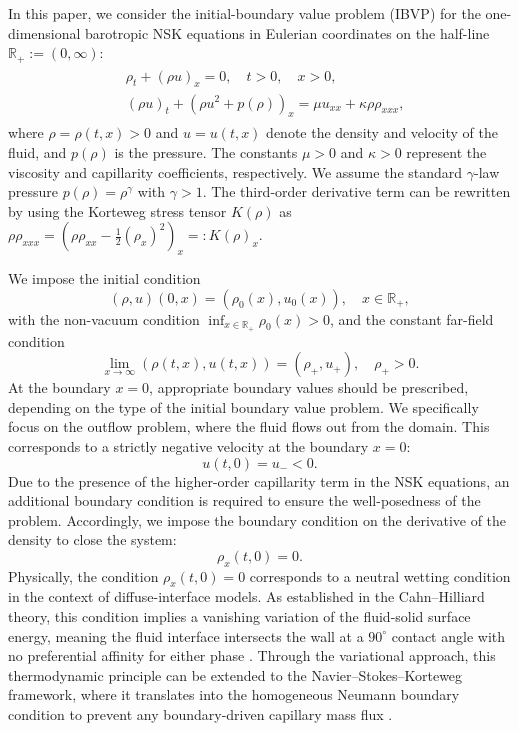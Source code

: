 \documentclass[11pt,reqno]{amsart}
\numberwithin{equation}{section} %
\begin{document}
In this paper, we consider the initial-boundary value problem (IBVP) for the one-dimensional barotropic NSK equations in Eulerian coordinates on the half-line $\mathbb{R}_+ := (0, \infty)$:
\begin{align} \label{eq:NSK}
\begin{aligned}
    &\rho_t +(\rho u)_x=0, \quad t>0, \quad x>0, \\
    &(\rho u)_t +(\rho u^2+p(\rho))_x = \mu u_{xx} + \kappa \rho\rho_{xxx},
\end{aligned}
\end{align}
where $\rho=\rho(t,x)>0$ and $u=u(t,x)$ denote the density and velocity of the fluid, and $p(\rho)$ is the pressure. The constants $\mu > 0$ and $\kappa > 0$ represent the viscosity and capillarity coefficients, respectively. We assume the standard $\gamma$-law pressure $p(\rho)=\rho^\gamma$ with $\gamma > 1$. The third-order derivative term can be rewritten by using the Korteweg stress tensor $K(\rho)$ as $\rho\rho_{xxx} = \left(\rho\rho_{xx}-\frac{1}{2}(\rho_x)^2\right)_x =: K(\rho)_x$. 

We impose the initial condition
\begin{equation*}%
    (\rho, u)(0,x) = (\rho_0(x), u_0(x)), \quad x \in \mathbb{R}_+,
\end{equation*}
with the non-vacuum condition $\inf_{x\in\mathbb{R}_+}\rho_0(x)>0$, and the constant far-field condition
\begin{equation*}%
    \lim_{x\to\infty} (\rho(t,x), u(t,x)) = (\rho_+, u_+), \quad \rho_+>0.
\end{equation*}
At the boundary $x=0$, appropriate boundary values should be prescribed, depending on the type of the initial boundary value problem. We specifically focus on the outflow problem, where the fluid flows out from the domain. This corresponds to a strictly negative velocity at the boundary $x=0$:
\begin{equation}\label{eq:BC-outflow}
    u(t,0) = u_- < 0.
\end{equation}
Due to the presence of the higher-order capillarity term in the NSK equations, an additional boundary condition is required to ensure the well-posedness of the problem. Accordingly, we impose the boundary condition on the derivative of the density to close the system:%
\begin{equation}\label{eq:BC-capillarity}
    \rho_x(t,0) = 0.
\end{equation}
Physically, the condition $\rho_x(t,0) = 0$ corresponds to a neutral wetting condition in the context of diffuse-interface models. As established in the Cahn--Hilliard theory, this condition implies a vanishing variation of the fluid-solid surface energy, meaning the fluid interface intersects the wall at a $90^\circ$ contact angle with no preferential affinity for either phase \cite{Seppecher93, Seppecher96}. Through the variational approach, this thermodynamic principle can be extended to the Navier--Stokes--Korteweg framework, where it translates into the homogeneous Neumann boundary condition to prevent any boundary-driven capillary mass flux \cite{Kotschote08, Kotschote10}.
\end{document}
